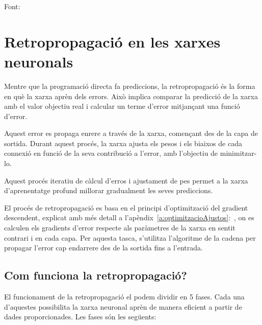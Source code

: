Font: \cite{TreballFinalDeGrau2}
\section{Retropropagació en les xarxes neuronals}\label{subsec:retropropagació}

Mentre que la programació directa fa prediccions, la retropropagació és la forma en què la xarxa aprèn dels errors. Això implica comparar la predicció de la xarxa amb el valor objectiu real i calcular un terme d'error mitjançant una funció d'error.

Aquest error es propaga enrere a través de la xarxa, començant des de la capa de sortida. Durant aquest procés, la xarxa ajusta els pesos i els biaixos de cada connexió en funció de la seva contribució a l'error, amb l'objectiu de minimitzar-lo.

Aquest procés iteratiu de càlcul d'erros i ajustament de pes permet a la xarxa d'aprenentatge profund millorar gradualment les seves prediccions.

El procés de retropropagació es basa en el principi d'optimització del gradient descendent, explicat amb més detall a l'apèndix~\ref{a:optimitzacioAjustos}:~, on es calculen els gradients d'error respecte als paràmetres de la xarxa en sentit contrari i en cada capa. Per aquesta tasca, s'utilitza l'algoritme de la cadena per propagar l'error cap endarrere des de la sortida fins a l'entrada.

\subsection{Com funciona la retropropagació?}


El funcionament de la retropropagació el podem dividir en 5 fases. Cada una d'aquestes possibilita la xarxa neuronal aprèn de manera eficient a partir de dades proporcionades. Les fases són les següents:



